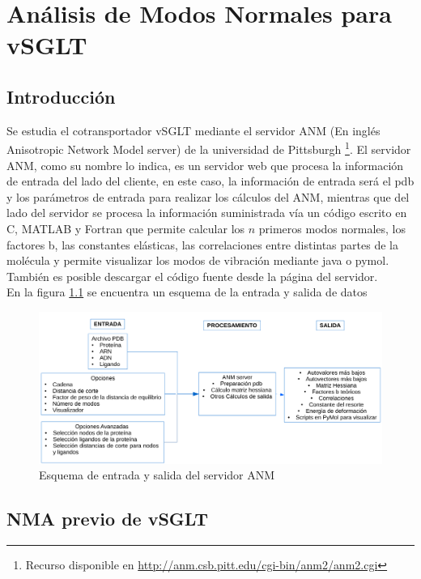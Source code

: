 \chapter{An\'{a}lisis de Modos Normales para vSGLT}\label{ch:4}

\section{Introducci\'{o}n}
Se estudia el cotransportador vSGLT mediante el servidor ANM (En ingl\'{e}s Anisotropic Network Model server) de la universidad de Pittsburgh \cite{Eyal2015}\footnote{Recurso disponible en \url{http://anm.csb.pitt.edu/cgi-bin/anm2/anm2.cgi}}. El servidor ANM, como su nombre lo indica, es un servidor web que procesa la informaci\'{o}n de entrada del lado del cliente, en este caso, la informaci\'{o}n de entrada ser\'{a} el pdb y los par\'{a}metros de entrada para realizar los c\'{a}lculos del ANM, mientras que del lado del servidor se procesa la informaci\'{o}n suministrada v\'{i}a un c\'{o}digo escrito en C, MATLAB y Fortran que permite calcular los $n$ primeros modos normales, los factores b, las constantes el\'{a}sticas, las correlaciones entre distintas partes de la mol\'{e}cula y permite visualizar los modos de vibraci\'{o}n mediante java o pymol. Tambi\'{e}n es posible descargar el c\'{o}digo fuente desde la p\'{a}gina del servidor.\\

En la figura \ref{fig:flujo} se encuentra un esquema de la entrada y salida de datos
\begin{figure}[h]
 \centering
    \includegraphics[scale=0.6]{./Kap4/flujo.pdf} 
\caption{Esquema de entrada y salida del servidor ANM}\label{fig:flujo}
\end{figure}

\section{NMA previo de vSGLT}
